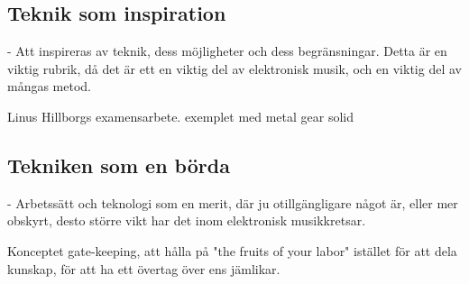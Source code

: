 \documentclass{article}
\begin{document}
	













\subsection{Teknik som inspiration}
- Att inspireras av teknik, dess möjligheter och dess begränsningar. Detta är en viktig rubrik, då det är ett
  en viktig del av elektronisk musik, och en viktig del av mångas metod. 

  Linus Hillborgs examensarbete. exemplet med metal gear solid

\subsection{Tekniken som en börda}
- Arbetssätt och teknologi som en merit, där ju otillgängligare något är, eller mer obskyrt, desto större vikt
  har det inom elektronisk musikkretsar. 

  Konceptet gate-keeping, att hålla på "the fruits of your labor" istället för att dela kunskap, för att ha
  ett övertag över ens jämlikar.
\end{document}
